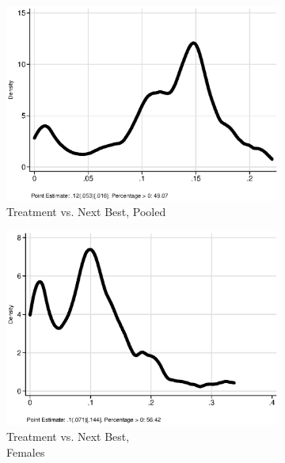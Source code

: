 \begin{figure}
\centering
\caption{Internal Rate of Return, by Gender and by Parameter}\label{figure:irrdist}
\begin{subfigure}[h]{0.25\textwidth}
		\centering
		\caption{Treatment vs. Next Best, Pooled}
		\includegraphics[width=\textwidth]{output/irr_2_sexp.eps}
\end{subfigure}%
\begin{subfigure}[h]{0.25\textwidth}
	\centering
	\caption{Treatment vs. Next Best,\\ Females}
		\includegraphics[width=\textwidth]{output/irr_2_sexf.eps}
\end{subfigure}%
\begin{subfigure}[h]{0.25\textwidth}

\end{subfigure}
\end{figure}
